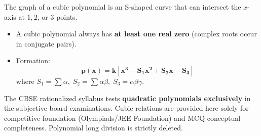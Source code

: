 \documentclass[10pt,a4paper]{article}
\begin{document}
\begin{minipage}[t]{0.56\textwidth}
  The graph of a cubic polynomial is an S-shaped curve that can intersect the $x$-axis at $1, 2$, or $3$ points.
  \begin{itemize}[itemsep=1pt]
    \item A cubic polynomial always has \textbf{at least one real zero} (complex roots occur in conjugate pairs).
    \item Formation:
      \[
        \mathbf{p(x) = k\left[x^3 - S_1 x^2 + S_2 x - S_3\right]}
      \]
      where $S_1 = \sum\alpha, \; S_2 = \sum\alpha\beta, \; S_3 = \alpha\beta\gamma$.
  \end{itemize}
\end{minipage}\hfill
\begin{minipage}[t]{0.41\textwidth}
  \begin{center}
  \end{center}
\end{minipage}

\vspace{-1mm}
\begin{warningBox}[title=CBSE 2026--27 Scope Demarcation Alert,fonttitle=\bfseries\color{navy}]
  The CBSE rationalized syllabus tests \textbf{quadratic polynomials exclusively} in the subjective board examinations. Cubic relations are provided here solely for competitive foundation (Olympiads/JEE Foundation) and MCQ conceptual completeness. Polynomial long division is strictly deleted.
\end{warningBox}

\clearpage

\thispagestyle{fancy}
\vspace*{0mm}
\end{document}
